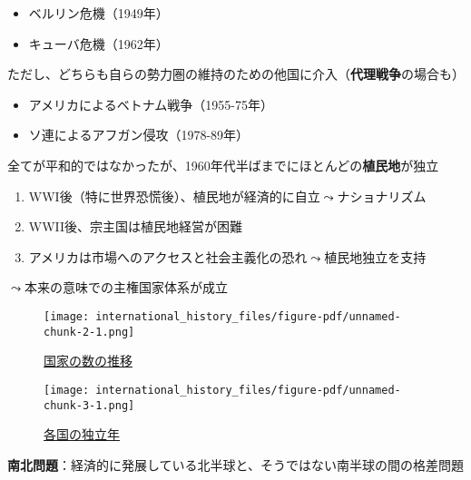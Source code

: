 \documentclass[
  xelatex,
  ja=standard]{bxjsarticle}
\providecommand{\tightlist}{%
  \setlength{\itemsep}{0pt}\setlength{\parskip}{0pt}}\usepackage{longtable,booktabs,array}
\begin{document}
\begin{itemize}
\tightlist
\item
  ベルリン危機（1949年）
\item
  キューバ危機（1962年）
\end{itemize}

ただし、どちらも自らの勢力圏の維持のための他国に介入（\textbf{代理戦争}の場合も）

\begin{itemize}
\tightlist
\item
  アメリカによるベトナム戦争（1955-75年）
\item
  ソ連によるアフガン侵攻（1978-89年）
\end{itemize}

全てが平和的ではなかったが、1960年代半ばまでにほとんどの\textbf{植民地}が独立

\begin{enumerate}
\def\labelenumi{\arabic{enumi}.}
\tightlist
\item
  WWI後（特に世界恐慌後）、植民地が経済的に自立\(\leadsto\)ナショナリズム
\item
  WWII後、宗主国は植民地経営が困難
\item
  アメリカは市場へのアクセスと社会主義化の恐れ\(\leadsto\)植民地独立を支持
\end{enumerate}

\(\leadsto\)本来の意味での主権国家体系が成立

\begin{figure}[htpb]

{\centering \texttt{[image: international\_history\_files/figure-pdf/unnamed-chunk-2-1.png]}

}

\caption{\href{https://correlatesofwar.org/data-sets/state-system-membership/}{国家の数の推移}}

\end{figure}

\begin{figure}[htpb]

{\centering \texttt{[image: international\_history\_files/figure-pdf/unnamed-chunk-3-1.png]}

}

\caption{\href{https://correlatesofwar.org/data-sets/state-system-membership/}{各国の独立年}}

\end{figure}

\textbf{南北問題}：経済的に発展している北半球と、そうではない南半球の間の格差問題
\end{document}
